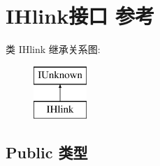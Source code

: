 \hypertarget{interface_i_hlink}{}\section{I\+Hlink接口 参考}
\label{interface_i_hlink}
类 I\+Hlink 继承关系图\+:\begin{figure}[H]
\begin{center}
\leavevmode
\includegraphics[height=2.000000cm]{interface_i_hlink}
\end{center}
\end{figure}
\subsection*{Public 类型}
